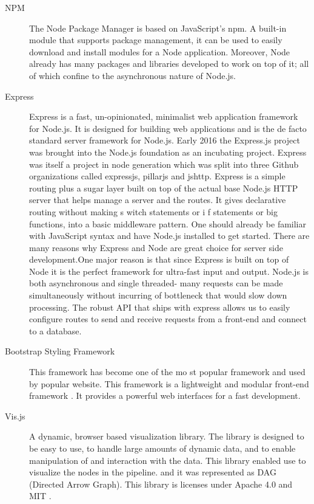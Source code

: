 \begin{description}
\begin{itemize}
    \end{itemize}
    \item[NPM] The Node Package Manager is based on JavaScript's npm. A built-in module that supports package management, it can be used to easily download and install modules for a Node application. Moreover, Node already has many packages and libraries developed to work on top of it; all of which confine to the asynchronous nature of Node.js.
    \item[Express] Express is a fast, un-opinionated, minimalist web application framework for Node.js. It is designed for building web applications and is the de facto standard server framework for Node.js. Early 2016 the Express.js project was brought into the Node.js foundation as an incubating project. Express was itself a project in node generation which was split into three Github organizations called expressjs, pillarjs and jshttp. Express is a simple routing plus a sugar layer built on top of the actual base Node.js HTTP server that helps manage a server and the routes. It gives declarative routing without making s witch statements or i f statements or big functions, into a basic middleware pattern. \cite{express}
    \newline
    \newline
    One should already be familiar with JavaScript syntax and have Node.js installed to get started. There are many reasons why Express and Node are great choice for server side development.One major reason is that since Express is built on top of Node it is the perfect framework for ultra-fast input and output. Node.js is both asynchronous and single threaded- many requests can be made simultaneously without incurring of bottleneck that would slow down processing. The robust API that ships with express allows us to easily configure routes to send and receive
    requests from a front-end and connect to a database. \cite{express}
    \item[Bootstrap Styling Framework] This  framework  has  become  one  of  the  mo
    st  popular  framework  and  used  by  popular website. This framework is  a  lightweight  and  modular  front-end  framework  \cite{bootstrap}.   It  provides  a powerful  web  interfaces for a fast development.
    \item[Vis.js] A dynamic, browser based visualization library. The library is designed to be easy to use, to handle large amounts of dynamic data, and to enable manipulation of and interaction with the data. This library enabled use to visualize the nodes in the pipeline. and it was represented as DAG (Directed Arrow Graph). This library is licenses under Apache 4.0 and MIT \cite{visjs}.
\end{description}

